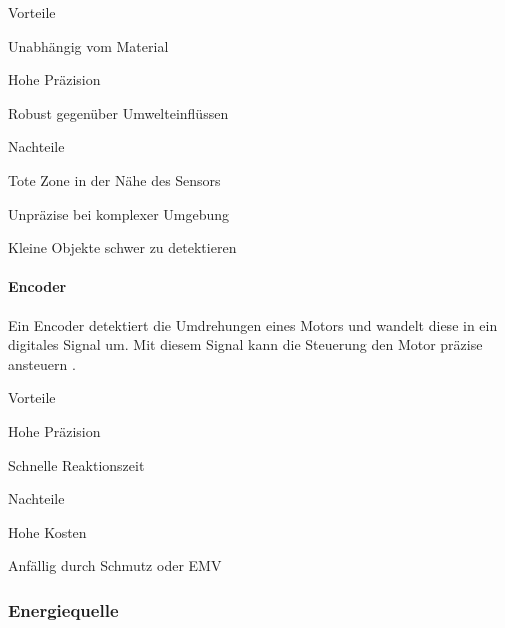 \documentclass[../main.tex]{subfiles}
\begin{document}
\begin{minipage}[t]{0.48\textwidth}
\begin{items}
  \item [Vorteile]
  \item Unabhängig vom Material
  \item Hohe Präzision
  \item Robust gegenüber Umwelteinflüssen
\end{items}
\end{minipage}
\hfill
\begin{minipage}[t]{0.48\textwidth}
\begin{items}
  \item [Nachteile]
  \item Tote Zone in der Nähe des Sensors
  \item Unpräzise bei komplexer Umgebung
  \item Kleine Objekte schwer zu detektieren
\end{items}
\end{minipage}

\paragraph{Encoder}
Ein Encoder detektiert die Umdrehungen eines Motors und wandelt diese in ein digitales Signal um. Mit diesem Signal kann die Steuerung den Motor präzise ansteuern \cite{encoder}.
 

\begin{minipage}[t]{0.48\textwidth}
\begin{items}
  \item [Vorteile]
  \item Hohe Präzision
  \item Schnelle Reaktionszeit
\end{items}
\end{minipage}
\hfill
\begin{minipage}[t]{0.48\textwidth}
\begin{items}
  \item [Nachteile]
  \item Hohe Kosten
  \item Anfällig durch Schmutz oder EMV
\end{items}
\end{minipage}


\subsubsection{Energiequelle}
\end{document}
